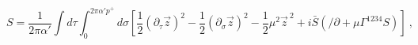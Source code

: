 \begin{equation}
 S = \frac{1}{2 \pi \alpha '} \int d \tau 
     \int ^{2 \pi \alpha ' p^+}_0 d \sigma  
     \left[ \frac{1}{2} (\partial_{\tau} \vec{z})^2
        -  \frac{1}{2} (\partial_{\sigma} \vec{z})^2 
        - \frac{1}{2} \mu^2 \vec{z}^{\ 2} 
   + i \bar S (\slash \!\!\! \partial + \mu \Gamma^{1234} S )\right] ~,
\end{equation}


